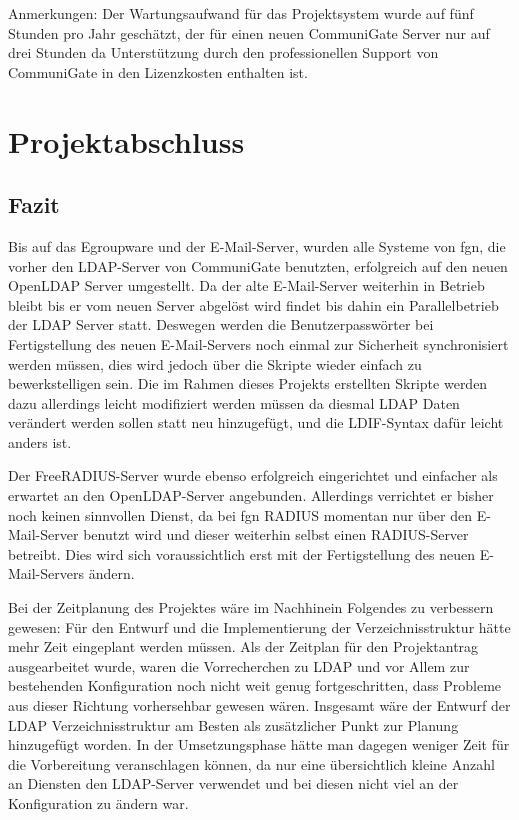 \documentclass[11pt,a4paper,titlepage=firstiscover,headsepline,bibtotoc]{scrartcl} %
\begin{document}
\medskip \noindent Anmerkungen: Der Wartungsaufwand für das Projektsystem wurde auf fünf Stunden pro Jahr geschätzt, der für einen neuen CommuniGate Server nur auf drei Stunden da Unterstützung durch den professionellen Support von CommuniGate in den Lizenzkosten enthalten ist.

\section{Projektabschluss}
\subsection{Fazit}
Bis auf das Egroupware und der E-Mail-Server, wurden alle Systeme von fgn, die vorher den LDAP-Server von CommuniGate benutzten, erfolgreich auf den neuen OpenLDAP Server umgestellt. Da der alte E-Mail-Server weiterhin in Betrieb bleibt bis er vom neuen Server abgelöst wird findet bis dahin ein Parallelbetrieb der LDAP Server statt. Deswegen werden die Benutzerpasswörter bei Fertigstellung des neuen E-Mail-Servers noch einmal zur Sicherheit synchronisiert werden müssen, dies wird jedoch über die Skripte wieder einfach zu bewerkstelligen sein. Die im Rahmen dieses Projekts erstellten Skripte werden dazu allerdings leicht modifiziert werden müssen da diesmal LDAP Daten verändert werden sollen statt neu hinzugefügt, und die LDIF-Syntax dafür leicht anders ist.

Der FreeRADIUS-Server wurde ebenso erfolgreich eingerichtet und einfacher als erwartet an den OpenLDAP-Server angebunden. Allerdings verrichtet er bisher noch keinen sinnvollen Dienst, da bei fgn RADIUS momentan nur über den E-Mail-Server benutzt wird und dieser weiterhin selbst einen RADIUS-Server betreibt. Dies wird sich voraussichtlich erst mit der Fertigstellung des neuen E-Mail-Servers ändern.

Bei der Zeitplanung des Projektes wäre im Nachhinein Folgendes zu verbessern gewesen: Für den Entwurf und die Implementierung der Verzeichnisstruktur hätte mehr Zeit eingeplant werden müssen. Als der Zeitplan für den Projektantrag ausgearbeitet wurde, waren die Vorrecherchen zu LDAP und vor Allem zur bestehenden Konfiguration noch nicht weit genug fortgeschritten, dass Probleme aus dieser Richtung vorhersehbar gewesen wären. Insgesamt wäre der Entwurf der LDAP Verzeichnisstruktur am Besten als zusätzlicher Punkt zur Planung hinzugefügt worden. In der Umsetzungsphase hätte man dagegen weniger Zeit für die Vorbereitung veranschlagen können, da nur eine übersichtlich kleine Anzahl an Diensten den LDAP-Server verwendet und bei diesen nicht viel an der Konfiguration zu ändern war.
\end{document}
